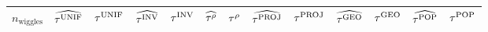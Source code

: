 \begin{landscape}
    \begin{table}[p]
        \begin{tabular}{r|rrrrrrrrrrrr}
            \hline
            \(n_{\mathrm{wiggles}}\) & \(\widehat{\tau^{\mathrm{UNIF}}}\) & \(\tau^{\mathrm{UNIF}}\) & \(\widehat{\tau^{\mathrm{INV}}}\) & \(\tau^{\mathrm{INV}}\) & \(\widehat{\tau^{\rho}}\) & \(\tau^{\rho}\) & \(\widehat{\tau^{\mathrm{PROJ}}}\) & \(\tau^{\mathrm{PROJ}}\) & \(\widehat{\tau^{\mathrm{GEO}}}\) & \(\tau^{\mathrm{GEO}}\) & \(\widehat{\tau^{\mathrm{POP}}}\) & \(\tau^{\mathrm{POP}}\)\\
            \hline


\end{tabular}
\end{table}
\end{landscape}
